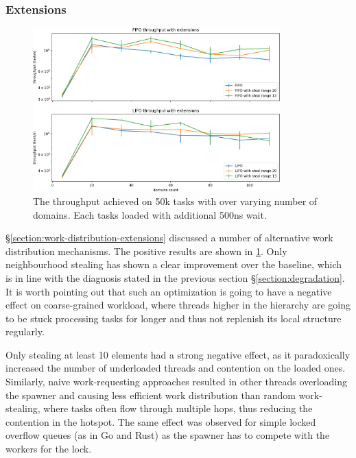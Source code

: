 \documentclass[12pt,a4paper,twoside]{report}
\begin{document}
\subsubsection{Extensions}
\label{section:extensions}



\begin{figure} 
     \centering
     \includegraphics[width=0.85\textwidth]{eval/packet-basic-distribution10-granular.png}
     \caption{The throughput achieved on 50k tasks with over varying number of domains. Each tasks loaded with additional 500ns wait.}
    \label{fig:packet-extenstions}
\end{figure}


\S\ref{section:work-distribution-extensions} discussed a number of alternative work distribution mechanisms. The positive results are shown in \ref{fig:packet-extenstions}. Only neighbourhood stealing has shown a clear improvement over the baseline, which is in line with the diagnosis stated in the previous section \S\ref{section:degradation}. It is worth pointing out that such an optimization is going to have a negative effect on coarse-grained workload, where threads higher in the hierarchy are going to be stuck processing tasks for longer and thus not replenish its local structure regularly. 

Only stealing at least 10 elements had a strong negative effect, as it paradoxically increased the number of underloaded threads and contention on the loaded ones. Similarly, naive work-requesting approaches resulted in other threads overloading the spawner and causing less efficient work distribution than random work-stealing, where tasks often flow through multiple hops, thus reducing the contention in the hotspot. The same effect was observed for simple locked overflow queues (as in Go and Rust) as the spawner has to compete with the workers for the lock.
\end{document}
